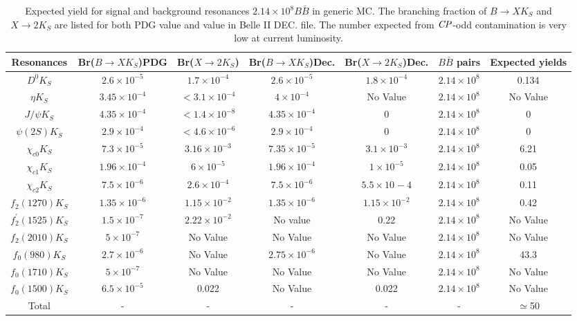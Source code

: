 \begin{table}
	\caption{Expected yield for signal and background resonances $2.14\times 10^8 B\bar{B}$ in generic MC. The branching fraction of $B\to X K_S$ and $X \to 2K_S$ are listed for both PDG value and value in Belle II DEC. file. The number expected from $\it{CP}$-odd contamination is very low at current luminosity.  }
	\centering
	\begin{tabular}{|c|c|c|c|c|c|c|}
		\hline
		Resonances & Br($B \to X K_S$)PDG  & Br($X \to2K_S$) & Br($B \to X K_S$)Dec. & Br($X \to2K_S$)Dec. & $B\bar{B}$ pairs & Expected yields \\
		\hline
		$D^0 K_S$ & $2.6 \times 10^{-5}$ & $1.7\times 10^{-4}$ & $2.6 \times 10^{-5}$ & $1.8\times 10^{-4}$ & $2.14\times 10^8$ & 0.134 \\
		\hline
		$\eta K_S$ & $3.45\times 10^{-4}$ & $<3.1\times 10^{-4}$ & $4\times 10^{-4}$ & No Value & $2.14\times 10^8$ & No Value  \\
		\hline
		$J/\psi K_S$ & $4.35\times 10^{-4}$ & $<1.4\times 10^{-8}$ & $4.35\times 10^{-4}$ & 0 & $2.14\times 10^8$ & 0 \\
		\hline
		$\psi(2S)K_S$ & $2.9\times 10^{-4}$ & $<4.6\times 10^{-6}$ & $2.9\times 10^{-4}$ & 0 & $2.14\times 10^8$ & 0 \\
		\hline
		$\chi_{c0}K_S$ & $7.3\times 10^{-5}$ & $3.16\times 10^{-3}$ & $7.35\times 10^{-5}$ & $3.1\times 10^{-3}$ & $2.14\times 10^8$ & 6.21 \\
		\hline
		$\chi_{c1}K_S$ & $1.96\times 10^{-4}$ & $6\times 10^{-5}$ & $1.96\times 10^{-4}$ & $1\times 10^{-5}$ & $2.14\times 10^8$ & 0.05 \\
		\hline
		$\chi_{c2}K_S$ & $7.5\times 10^{-6}$ & $2.6\times 10^{-4}$ & $7.5\times 10^{-6}$ & $5.5\times 10^{}-4$ & $2.14\times 10^8$ & 0.11 \\
		\hline
		$f_2(1270)K_S$ & $1.35\times 10^{-6}$ & $1.15\times 10^{-2}$ & $1.35\times 10^{-6}$ & $1.15\times 10^{-2}$ & $2.14\times 10^8$ & 0.42 \\
		\hline
		$f_{2}^{'}(1525)K_S$ & $1.5\times 10^{-7} $ & $2.22\times 10^{-2}$ & No value & 0.22 & $2.14\times 10^8$ & No Value \\
		\hline
		$f_2(2010)K_S$ & $5\times 10^{-7}$ & No Value  & No Value  & No Value  & $2.14\times 10^8$ & No Value \\
		\hline
		$f_0(980)K_S$ & $2.7\times 10^{-6}$ & No Value & $2.75\times 10^{-6}$ & No Value & $2.14\times 10^8$ & 43.3 \\
		\hline
		$f_0(1710)K_S$ & $5\times 10^{-7}$ & No Value  & No Value  & No Value  & $2.14\times 10^8$ & No Value \\
		\hline
		$f_0(1500)K_S$ & $6.5\times 10^{-5}$ & 0.022 & No Value & 0.022 & $2.14\times 10^8$ & No Value \\
		\hline
		Total  & - & - & - & - & - & $\simeq$50 \\
		\hline
	\end{tabular}
\end{table}

